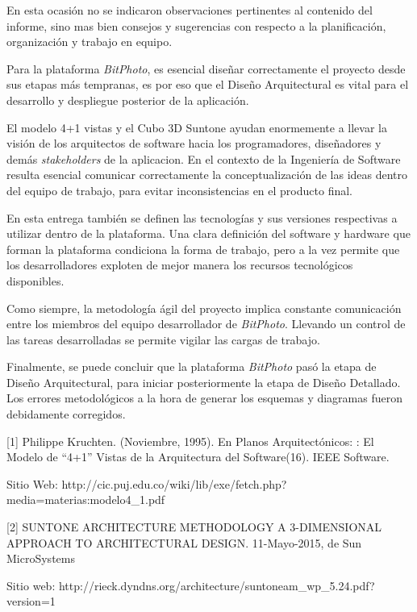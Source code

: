 \documentclass{memoria}
\begin{document}

En esta ocasión no se indicaron observaciones pertinentes al contenido del informe, sino mas bien consejos y sugerencias con respecto a la planificación, organización y trabajo en equipo.


Para la plataforma \textsl{BitPhoto}, es esencial diseñar correctamente el proyecto desde sus etapas más tempranas, es por eso que el Diseño Arquitectural es vital para el desarrollo y despliegue posterior de la aplicación.

El modelo 4+1 vistas y el Cubo 3D Suntone ayudan enormemente a llevar la visión de los arquitectos de software hacia los programadores, diseñadores y demás \textsl{stakeholders} de la aplicacion. En el contexto de la Ingeniería de Software resulta esencial comunicar correctamente la conceptualización de las ideas dentro del equipo de trabajo, para evitar inconsistencias en el producto final.

En esta entrega también se definen las tecnologías y sus versiones respectivas a utilizar dentro de la plataforma. Una clara definición del software y hardware que forman la plataforma condiciona la forma de trabajo, pero a la vez permite que los desarrolladores exploten de mejor manera los recursos tecnológicos disponibles.

Como siempre, la metodología ágil del proyecto implica constante comunicación entre los miembros del equipo desarrollador de \textsl{BitPhoto}. Llevando un control de las tareas desarrolladas se permite vigilar las cargas de trabajo.

Finalmente, se puede concluir que la plataforma \textsl{BitPhoto} pasó la etapa de Diseño Arquitectural, para iniciar posteriormente la etapa de Diseño Detallado. Los errores metodológicos a la hora de generar los esquemas y diagramas fueron debidamente corregidos.




[1] Philippe Kruchten. (Noviembre, 1995). En Planos Arquitectónicos: : El Modelo de “4+1” Vistas de la Arquitectura del Software(16). IEEE Software. 

Sitio Web: http://cic.puj.edu.co/wiki/lib/exe/fetch.php?media=materias:modelo4\_1.pdf

[2] SUNTONE ARCHITECTURE METHODOLOGY A 3-DIMENSIONAL APPROACH TO ARCHITECTURAL DESIGN. 11-Mayo-2015, de Sun MicroSystems 

Sitio web: http://rieck.dyndns.org/architecture/suntoneam\_wp\_5.24.pdf?version=1
\end{document}

